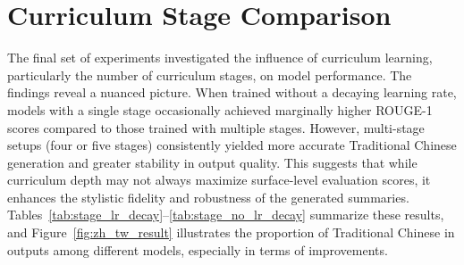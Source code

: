 \section{Curriculum Stage Comparison}
The final set of experiments investigated the influence of curriculum learning, particularly the number of curriculum stages, on model performance. The findings reveal a nuanced picture. When trained without a decaying learning rate, models with a single stage occasionally achieved marginally higher ROUGE-1 scores compared to those trained with multiple stages. However, multi-stage setups (four or five stages) consistently yielded more accurate Traditional Chinese generation and greater stability in output quality. This suggests that while curriculum depth may not always maximize surface-level evaluation scores, it enhances the stylistic fidelity and robustness of the generated summaries.
Tables~\ref{tab:stage_lr_decay}--\ref{tab:stage_no_lr_decay} summarize these results, and Figure~\ref{fig:zh_tw_result} illustrates the proportion of Traditional Chinese in outputs among different models, especially in terms of improvements.



